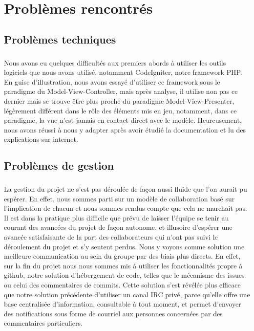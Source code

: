 \chapter{Problèmes rencontrés}


\section{Problèmes techniques}
    \paragraph{}
        Nous avons eu quelques difficultés aux premiers abords à utiliser les 
        outils logiciels que nous avons utilisé, notamment CodeIgniter, notre
        framework PHP.
        En guise d'illustration, nous avons essayé d'utiliser ce framework 
        sous le paradigme du Model-View-Controller, mais après analyse, il
        utilise non pas ce dernier mais se trouve être plus proche du
        paradigme Model-View-Presenter, légèrement différent dans le rôle
        des éléments mis en jeu, notamment, dans ce paradigme, la vue n'est
        jamais en contact direct avec le modèle.
        Heureusement, nous avons réussi à nous y adapter après avoir étudié
        la documentation et lu des explications sur internet.
        
\section{Problèmes de gestion}
    \paragraph{}
        La gestion du projet ne s'est pas déroulée de façon aussi fluide que 
        l'on aurait pu espérer. En effet, nous sommes parti sur un modèle de 
        collaboration basé sur l'implication de chacun et nous sommes rendus
        compte que cela ne marchait pas. Il est dans la pratique plus difficile
        que prévu de laisser l'équipe se tenir au courant des avancées du
        projet de façon autonome, et illusoire d'espérer une avancée 
        satisfaisante de la part des collaborateurs qui n'ont pas suivi le 
        déroulement du projet et s'y sentent perdus. Nous y voyons comme 
        solution une meilleure communication au sein du groupe par des biais
        plus directs. En effet, sur la fin du projet nous nous sommes mis à
        utiliser les fonctionnalités propre à github, notre solution 
        d'hébergement de code, telles que le mécanisme des issues ou celui des
        commentaires de commits. Cette solution s'est révélée plus efficace que
        notre solution précédente d'utiliser un canal IRC privé, parce qu'elle
        offre une base centralisée d'information, consultable à tout moment,
        et permet d'envoyer des notifications sous forme de courriel aux
        personnes concernées par des commentaires particuliers.

